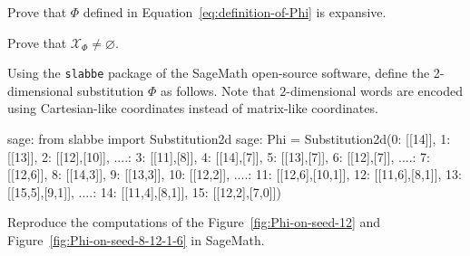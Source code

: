 \documentclass[12pt]{amsart}
\newcommand{\N}{\mathbb{N}}
\newcommand{\bn}{{\boldsymbol{n}}}
\newcommand{\Acal}{\mathcal{A}} %
\newcommand{\Xcal}{\mathcal{X}} %
\newcommand{\shape}{\textsc{shape}}
\newcommand{\ifnv}[2]{\ifthenelse{\equal{#1}{}}{}{#2}}
\newcommand\defn[2][]{\ifnv{#1}{\index{#1|\textbf}}{\index{#2|\textbf}}\textbf{#2}}
\begin{document}
% 


\begin{exo}[label={exo:prove-expansive}]
    Prove that $\Phi$ defined in 
    Equation~\eqref{eq:definition-of-Phi} 
    is expansive.
\end{exo}


\begin{exo}[label={exo:substitutive-shift-nonempty}]
    Prove that $\Xcal_\Phi\neq\varnothing$.
\end{exo}

\clearpage %

\begin{exo}[label={exo:Phi-sagemath}]
    Using the \texttt{slabbe} package of the SageMath open-source software,
    define the 2-dimensional substitution $\Phi$ as follows.
    Note that $2$-dimensional words are encoded using Cartesian-like
    coordinates instead of matrix-like coordinates.
\begin{sagecommandlinetcb}
\begin{sagecommandline}
sage: from slabbe import Substitution2d
sage: Phi = Substitution2d({0: [[14]], 1: [[13]], 2: [[12],[10]],
....: 3: [[11],[8]], 4: [[14],[7]], 5: [[13],[7]], 6: [[12],[7]],
....: 7: [[12,6]], 8: [[14,3]], 9: [[13,3]], 10: [[12,2]],
....: 11: [[12,6],[10,1]], 12: [[11,6],[8,1]], 13: [[15,5],[9,1]],
....: 14: [[11,4],[8,1]], 15: [[12,2],[7,0]]})
\end{sagecommandline}
\end{sagecommandlinetcb}
    Reproduce the computations of the 
    Figure~\ref{fig:Phi-on-seed-12} and
    Figure~\ref{fig:Phi-on-seed-8-12-1-6}
    in SageMath.
\end{exo}
\end{document}
